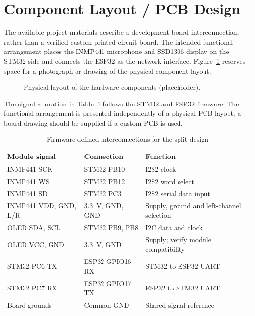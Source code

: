 \documentclass[a4paper,12pt,oneside]{report}
\begin{document}
\section{Component Layout / PCB Design}
\label{sec:layout}
The available project materials describe a development-board interconnection, rather than a verified custom printed circuit board. The intended functional arrangement places the INMP441 microphone and SSD1306 display on the STM32 side and connects the ESP32 as the network interface. Figure~\ref{fig:layout} reserves space for a photograph or drawing of the physical component layout.
\begin{figure}[htbp]
\centering
{}
\caption{Physical layout of the hardware components (placeholder).}
\label{fig:layout}
\end{figure}

The signal allocation in Table~\ref{tab:wiring} follows the STM32 and ESP32 firmware. The functional arrangement is presented independently of a physical PCB layout; a board drawing should be supplied if a custom PCB is used.
\begin{table}[htbp]
\centering
\caption{Firmware-defined interconnections for the split design}
\label{tab:wiring}
\small
\begin{tabularx}{\textwidth}{@{}l l X@{}}
\toprule
Module signal & Connection & Function \\
\midrule
INMP441 SCK & STM32 PB10 & I2S2 clock \\
INMP441 WS & STM32 PB12 & I2S2 word select \\
INMP441 SD & STM32 PC3 & I2S2 serial data input \\
INMP441 VDD, GND, L/R & 3.3~V, GND, GND & Supply, ground and left-channel selection \\
OLED SDA, SCL & STM32 PB9, PB8 & I2C data and clock \\
OLED VCC, GND & 3.3~V, GND & Supply; verify module compatibility \\
STM32 PC6 TX & ESP32 GPIO16 RX & STM32-to-ESP32 UART \\
STM32 PC7 RX & ESP32 GPIO17 TX & ESP32-to-STM32 UART \\
Board grounds & Common GND & Shared signal reference \\
\bottomrule
\end{tabularx}
\end{table}
\end{document}
